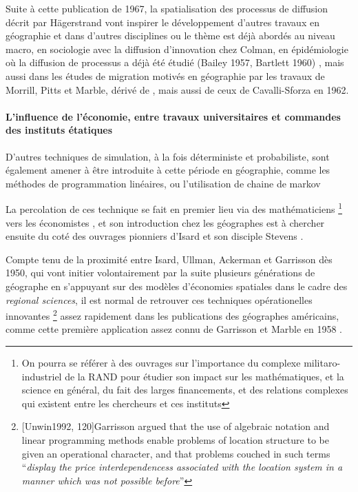 Suite à cette publication de 1967, la spatialisation des processus de diffusion décrit par Hägerstrand vont inspirer le développement d'autres travaux en géographie et dans d'autres disciplines ou le thème est déjà abordés au niveau macro, en sociologie avec la diffusion d'innovation chez Colman, en épidémiologie \autocite{Cliff1981, Cliff2000} où la diffusion de processus a déjà été étudié (Bailey 1957, Bartlett 1960) \textcite{Pitts1963, Morrill1968}, mais aussi dans les études de migration motivés en géographie par les travaux de Morrill, Pitts et Marble, dérivé de \autocite{Wolpert1965}, mais aussi de ceux de Cavalli-Sforza en 1962. 

\paragraph{L'influence de l'économie, entre travaux universitaires et commandes des instituts étatiques}

D'autres techniques de simulation, à la fois déterministe et probabiliste, sont également amener à être introduite à cette période en géographie, comme les méthodes de programmation linéaires, ou l'utilisation de chaine de markov \autocite{Marble1964} \autocite{Clark1965} 

La percolation de ces technique se fait en premier lieu via des mathématiciens \footnote{On pourra se référer à des ouvrages sur l'importance du complexe militaro-industriel de la RAND pour étudier son impact sur les mathématiques, et la science en général, du fait des larges financements, et des relations complexes qui existent entre les chercheurs et ces instituts} vers les économistes \autocite{Samuelson1952}, et son introduction chez les géographes est à chercher ensuite du coté des ouvrages pionniers d'Isard \autocite{Isard1956} \autocite{Isard1958} et son disciple Stevens \autocite{Stevens1958}.

Compte tenu de la proximité entre Isard, Ullman, Ackerman et Garrisson \autocite{Barnes2004} dès 1950, qui vont initier volontairement \autocite[120]{Unwin1992} par la suite plusieurs générations de géographe en s'appuyant sur des modèles d'économies spatiales dans le cadre des \textit{regional sciences}, il est normal de retrouver ces techniques opérationelles innovantes \footnote{ [Unwin1992, 120]{Garrisson argued that the use of algebraic notation and linear programming methods enable problems of location structure to be given an operational character, and that problems couched in such terms \enquote{\textit{display the price interdependencess associated with the location system in a manner which was not possible before}}}} assez rapidement dans les publications des géographes américains, comme cette première application assez connu de Garrisson et Marble en 1958 \autocite{Garrison1958}.

